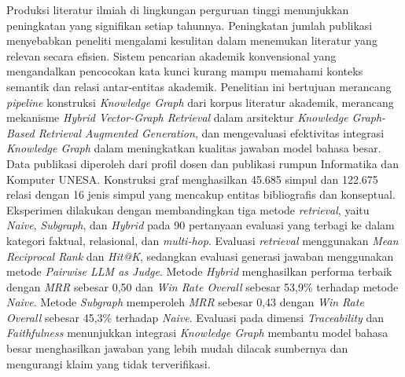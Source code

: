 \begin{Abstrak}
    Produksi literatur ilmiah di lingkungan perguruan tinggi menunjukkan peningkatan yang signifikan setiap tahunnya. Peningkatan jumlah publikasi menyebabkan peneliti mengalami kesulitan dalam menemukan literatur yang relevan secara efisien. Sistem pencarian akademik konvensional yang mengandalkan pencocokan kata kunci kurang mampu memahami konteks semantik dan relasi antar-entitas akademik. Penelitian ini bertujuan merancang \textit{pipeline} konstruksi \textit{Knowledge Graph} dari korpus literatur akademik, merancang mekanisme \textit{Hybrid Vector-Graph Retrieval} dalam arsitektur \textit{Knowledge Graph-Based Retrieval Augmented Generation}, dan mengevaluasi efektivitas integrasi \textit{Knowledge Graph} dalam meningkatkan kualitas jawaban model bahasa besar. Data publikasi diperoleh dari profil dosen dan publikasi rumpun Informatika dan Komputer UNESA. Konstruksi graf menghasilkan 45.685 simpul dan 122.675 relasi dengan 16 jenis simpul yang mencakup entitas bibliografis dan konseptual. Eksperimen dilakukan dengan membandingkan tiga metode \textit{retrieval}, yaitu \textit{Naive}, \textit{Subgraph}, dan \textit{Hybrid} pada 90 pertanyaan evaluasi yang terbagi ke dalam kategori faktual, relasional, dan \textit{multi-hop}. Evaluasi \textit{retrieval} menggunakan \textit{Mean Reciprocal Rank} dan \textit{Hit@K}, sedangkan evaluasi generasi jawaban menggunakan metode \textit{Pairwise LLM as Judge}. Metode \textit{Hybrid} menghasilkan performa terbaik dengan \textit{MRR} sebesar 0,50 dan \textit{Win Rate Overall} sebesar 53,9\% terhadap metode \textit{Naive}. Metode \textit{Subgraph} memperoleh \textit{MRR} sebesar 0,43 dengan \textit{Win Rate Overall} sebesar 45,3\% terhadap \textit{Naive}. Evaluasi pada dimensi \textit{Traceability} dan \textit{Faithfulness} menunjukkan integrasi \textit{Knowledge Graph} membantu model bahasa besar menghasilkan jawaban yang lebih mudah dilacak sumbernya dan mengurangi klaim yang tidak terverifikasi.

\end{Abstrak}
